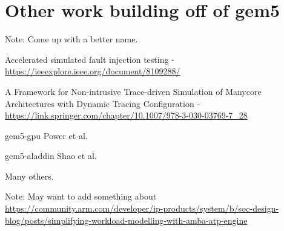 \section{Other work building off of gem5}

Note: Come up with a better name.

Accelerated simulated fault injection testing - \url{https://ieeexplore.ieee.org/document/8109288/}

A Framework for Non-intrusive Trace-driven Simulation of Manycore Architectures with Dynamic Tracing Configuration - \url{https://link.springer.com/chapter/10.1007/978-3-030-03769-7_28}

gem5-gpu Power et al.

gem5-aladdin Shao et al.

Many others.

Note: May want to add something about \url{https://community.arm.com/developer/ip-products/system/b/soc-design-blog/posts/simplifying-workload-modelling-with-amba-atp-engine}
